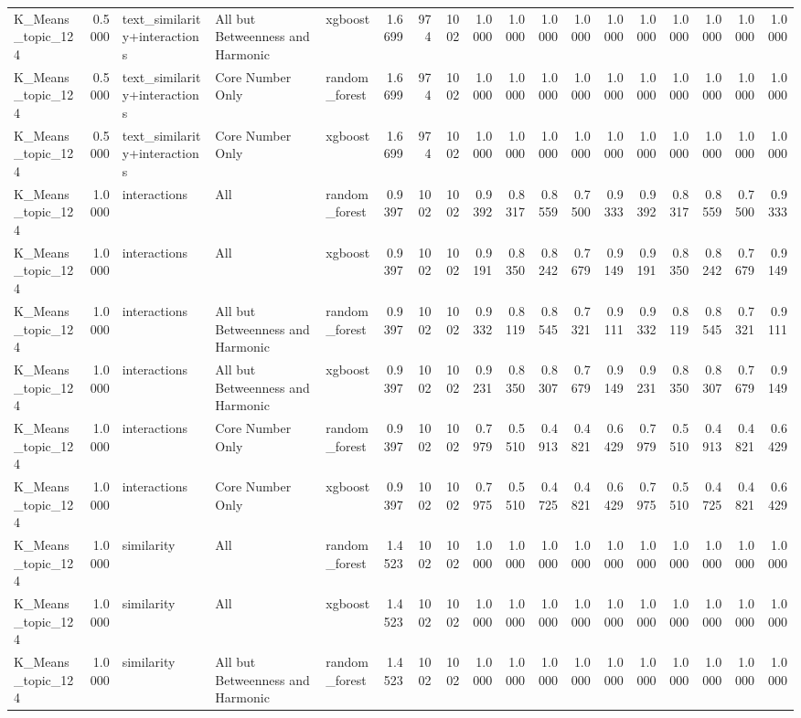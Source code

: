 \begin{tabular}{lrlllrrrrrrrrrrrrr}
K_Means_topic_124 & 0.5000 & text_similarity+interactions & All but Betweenness and Harmonic & xgboost & 1.6699 & 974 & 1002 & 1.0000 & 1.0000 & 1.0000 & 1.0000 & 1.0000 & 1.0000 & 1.0000 & 1.0000 & 1.0000 & 1.0000 \\
K_Means_topic_124 & 0.5000 & text_similarity+interactions & Core Number Only & random_forest & 1.6699 & 974 & 1002 & 1.0000 & 1.0000 & 1.0000 & 1.0000 & 1.0000 & 1.0000 & 1.0000 & 1.0000 & 1.0000 & 1.0000 \\
K_Means_topic_124 & 0.5000 & text_similarity+interactions & Core Number Only & xgboost & 1.6699 & 974 & 1002 & 1.0000 & 1.0000 & 1.0000 & 1.0000 & 1.0000 & 1.0000 & 1.0000 & 1.0000 & 1.0000 & 1.0000 \\
K_Means_topic_124 & 1.0000 & interactions & All & random_forest & 0.9397 & 1002 & 1002 & 0.9392 & 0.8317 & 0.8559 & 0.7500 & 0.9333 & 0.9392 & 0.8317 & 0.8559 & 0.7500 & 0.9333 \\
K_Means_topic_124 & 1.0000 & interactions & All & xgboost & 0.9397 & 1002 & 1002 & 0.9191 & 0.8350 & 0.8242 & 0.7679 & 0.9149 & 0.9191 & 0.8350 & 0.8242 & 0.7679 & 0.9149 \\
K_Means_topic_124 & 1.0000 & interactions & All but Betweenness and Harmonic & random_forest & 0.9397 & 1002 & 1002 & 0.9332 & 0.8119 & 0.8545 & 0.7321 & 0.9111 & 0.9332 & 0.8119 & 0.8545 & 0.7321 & 0.9111 \\
K_Means_topic_124 & 1.0000 & interactions & All but Betweenness and Harmonic & xgboost & 0.9397 & 1002 & 1002 & 0.9231 & 0.8350 & 0.8307 & 0.7679 & 0.9149 & 0.9231 & 0.8350 & 0.8307 & 0.7679 & 0.9149 \\
K_Means_topic_124 & 1.0000 & interactions & Core Number Only & random_forest & 0.9397 & 1002 & 1002 & 0.7979 & 0.5510 & 0.4913 & 0.4821 & 0.6429 & 0.7979 & 0.5510 & 0.4913 & 0.4821 & 0.6429 \\
K_Means_topic_124 & 1.0000 & interactions & Core Number Only & xgboost & 0.9397 & 1002 & 1002 & 0.7975 & 0.5510 & 0.4725 & 0.4821 & 0.6429 & 0.7975 & 0.5510 & 0.4725 & 0.4821 & 0.6429 \\
K_Means_topic_124 & 1.0000 & similarity & All & random_forest & 1.4523 & 1002 & 1002 & 1.0000 & 1.0000 & 1.0000 & 1.0000 & 1.0000 & 1.0000 & 1.0000 & 1.0000 & 1.0000 & 1.0000 \\
K_Means_topic_124 & 1.0000 & similarity & All & xgboost & 1.4523 & 1002 & 1002 & 1.0000 & 1.0000 & 1.0000 & 1.0000 & 1.0000 & 1.0000 & 1.0000 & 1.0000 & 1.0000 & 1.0000 \\
K_Means_topic_124 & 1.0000 & similarity & All but Betweenness and Harmonic & random_forest & 1.4523 & 1002 & 1002 & 1.0000 & 1.0000 & 1.0000 & 1.0000 & 1.0000 & 1.0000 & 1.0000 & 1.0000 & 1.0000 & 1.0000 \\

\end{tabular}
